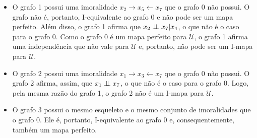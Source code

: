 \begin{exenumerate}
    \begin{solution}
        \begin{itemize}
            \item O grafo 1 possui uma imoralidade $x_2 \rightarrow x_5 \leftarrow x_7$ que o grafo 0 n\~ao possui. O grafo n\~ao \'e, portanto, I-equivalente ao grafo 0 e n\~ao pode ser um mapa perfeito. Al\'em disso, o grafo 1 afirma que $x_2 \mathrel{\perp\mspace{-10mu}\perp} x_7 | x_4$, o que n\~ao \'e o caso para o grafo 0. Como o grafo 0 \'e um mapa perfeito para $\mathcal{U}$, o grafo 1 afirma uma independ\^encia que n\~ao vale para $\mathcal{U}$ e, portanto, n\~ao pode ser um I-mapa para $\mathcal{U}.$
            \item O grafo 2 possui uma imoralidade $x_1 \rightarrow x_3 \leftarrow x_7$ que o grafo 0 n\~ao possui. O grafo 2 afirma, assim, que $x_1 \mathrel{\perp\mspace{-10mu}\perp} x_7$, o que n\~ao \'e o caso para o grafo 0. Logo, pela mesma raz\~ao do grafo 1, o grafo 2 n\~ao \'e um I-mapa para $\mathcal{U}$.
            \item O grafo 3 possui o mesmo esqueleto e o mesmo conjunto de imoralidades que o grafo 0. Ele \'e, portanto, I-equivalente ao grafo 0 e, consequentemente, tamb\'em um mapa perfeito.
        \end{itemize}
    \end{solution}
    
    
\end{exenumerate}


